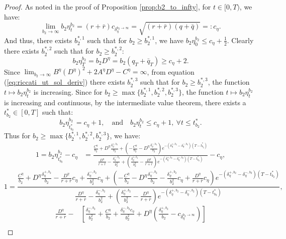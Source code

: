 \documentclass[11pt]{article}
\begin{document}
\begin{proof}
	As noted in the proof of Proposition \ref{prop:b2_to_infty}, for $t\in[0,T)$, we have:
	$$\lim_{b_2 \to \infty}b_2\eta^{b_2}_t=(r + \bar{r}) c_{\delta_{\eta}^{b_2 \to \infty}}=\sqrt{(r+\bar{r})(q+\bar{q})} =: c_\eta.$$
	And thus, there exists $b_2^{*,1}$ such that for $b_2 \geq b_2^{*,1}$, we have
	$b_2\eta^{b_2}_0 \leq c_\eta+\frac{1}{2}.$
	Clearly there exists $b_2^{*,2}$ such that for $b_2 \geq b_2^{*,2}$:
	$$b_2\eta^{b_2}_T=b_2D^\eta=b_2(q_T+\bar{q}_T)\geq c_\eta+2.$$
	Since $\lim_{b_2 \to \infty} B^\eta (D^\eta)^2+2A^\eta D^\eta-C^\eta=\infty$, from equation (\ref{eq:riccati_ut_sol_deriv}) there exists $b_2^{*,3}$ such that for $b_2 \geq b_2^{*,3}$, the function $t \mapsto b_2 \eta^{b_2}_t$ is increasing. Since for $b_2 \geq \max \{b_2^{*,1},b_2^{*,2},b_2^{*,3} \}$, the function $t \mapsto b_2 \eta^{b_2}_t$ is increasing and continuous, by the intermediate value theorem, there exists a $t^*_{b_2}\in[0,T]$ such that:
	$$b_2 \eta^{b_2}_{t^*_{b_2}} =c_\eta+1, \quad \text{and} \quad b_2 \eta^{b_2}_t \leq c_\eta+1,\ \forall t\leq t^*_{b_2}.$$
	Thus for $b_2 \geq \max \{b_2^{*,1},b_2^{*,2},b_2^{*,3} \}$, we have:
	\begin{equation*}
	\begin{split}
	1=b_2\eta^{b_2}_{t^*_{b_2}}-c_\eta&=\frac{ \frac{C^\eta}{b_2}+D^\eta\frac{\delta^{+,b_2}_\eta}{b_2}+\left(-\frac{C^\eta}{b_2}-D^\eta\frac{\delta^{-,b_2}_\eta}{b_2} \right)e^{-(\delta^{+,b_2}_\eta-\delta^{-,b_2}_\eta)(T-t^*_{b_2})} }{ \frac{D^\eta}{r+\bar{r}} -\frac{\delta^{-,b_2}_\eta}{b_2^2} +\left(\frac{\delta^{+,b_2}_\eta}{b_2^2} -\frac{D^\eta}{r+\bar{r}}\right) e^{-(\delta^{+,b_2}_\eta-\delta^{-,b_2}_\eta)(T-t^*_{b_2})}}-c_\eta,
	\end{split}
	\end{equation*}
	$$
	1=\frac{ \frac{C^\eta}{b_2}+D^\eta\frac{\delta^{+,b_2}_\eta}{b_2}-\frac{D^\eta}{r+\bar{r}}c_\eta +\frac{\delta^{-,b_2}_\eta}{b_2^2}c_\eta+\left(-\frac{C^\eta}{b_2}-D^\eta\frac{\delta^{-,b_2}_\eta}{b_2} -\frac{\delta^{+,b_2}_\eta}{b_2^2}c_\eta +\frac{D^\eta}{r+\bar{r}}c_\eta\right)e^{-(\delta^{+,b_2}_\eta-\delta^{-,b_2}_\eta)(T-t^*_{b_2})} }{ \frac{D^\eta}{r+\bar{r}} -\frac{\delta^{-,b_2}_\eta}{b_2^2} +\left(\frac{\delta^{+,b_2}_\eta}{b_2^2} -\frac{D^\eta}{r+\bar{r}}\right) e^{-(\delta^{+,b_2}_\eta-\delta^{-,b_2}_\eta)(T-t^*_{b_2})}},
	$$
	\begin{equation}
	\begin{split}
	\frac{D^\eta}{r+\bar{r}}-&\left[\frac{\delta^{-,b_2}_\eta}{b_2^2}+\frac{C^\eta}{b_2}+\frac{\delta^{-,b_2}_\eta c_\eta}{b_2^2}+D^\eta \left(\frac{\delta^{+,b_2}_\eta}{b_2}-c_{\delta^{b_2 \to \infty}_\eta} \right)\right] \\

\end{split}
\end{equation}
\end{proof}
\end{document}
